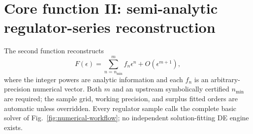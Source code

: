 \documentclass[11pt]{article}
\newcommand{\eps}{\epsilon}
\renewcommand{\_}{\origunderscore\allowbreak}
\begin{document}
\section{Core function II: semi-analytic regulator-series reconstruction}
\label{sec:reconstruction-overview}

The second function reconstructs
\begin{equation}
 F(\eps)=\sum_{n=n_{\min}}^{m}f_n\eps^n+O(\eps^{m+1}),
\end{equation}
where the integer powers are analytic information and each $f_n$ is an arbitrary-precision
numerical vector.  Both $m$ and an upstream symbolically certified $n_{\min}$ are required;
the sample grid, working precision, and surplus fitted orders are automatic unless overridden. Every regulator
sample calls the complete basic solver of Fig.~\ref{fig:numerical-workflow}; no independent
solution-fitting DE engine exists.
\end{document}

